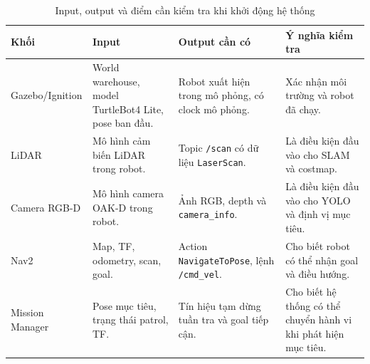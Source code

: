 \begin{table}[H]
    \centering
    \caption{Input, output và điểm cần kiểm tra khi khởi động hệ thống}
    \label{tab:startup-check}
    \renewcommand{\arraystretch}{1.25}
    \small
    \begin{tabularx}{\textwidth}{|>{\raggedright\arraybackslash}p{}|>{\raggedright\arraybackslash}p{}|>{\raggedright\arraybackslash}p{}|>{\raggedright\arraybackslash}X|}
        \hline
        \textbf{Khối} & \textbf{Input} & \textbf{Output cần có} & \textbf{Ý nghĩa kiểm tra} \\
        \hline
        Gazebo/Ignition & World warehouse, model TurtleBot4 Lite, pose ban đầu. & Robot xuất hiện trong mô phỏng, có clock mô phỏng. & Xác nhận môi trường và robot đã chạy. \\
        \hline
        LiDAR & Mô hình cảm biến LiDAR trong robot. & Topic \texttt{/scan} có dữ liệu \texttt{LaserScan}. & Là điều kiện đầu vào cho SLAM và costmap. \\
        \hline
        Camera RGB-D & Mô hình camera OAK-D trong robot. & Ảnh RGB, depth và \texttt{camera\_info}. & Là điều kiện đầu vào cho YOLO và định vị mục tiêu. \\
        \hline
        Nav2 & Map, TF, odometry, scan, goal. & Action \texttt{NavigateToPose}, lệnh \texttt{/cmd\_vel}. & Cho biết robot có thể nhận goal và điều hướng. \\
        \hline
        Mission Manager & Pose mục tiêu, trạng thái patrol, TF. & Tín hiệu tạm dừng tuần tra và goal tiếp cận. & Cho biết hệ thống có thể chuyển hành vi khi phát hiện mục tiêu. \\
        \hline
    \end{tabularx}
\end{table}


